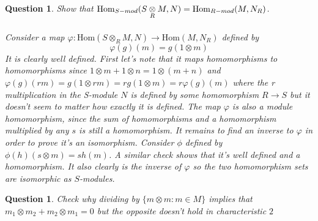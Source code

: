 \documentclass[a4paper]{article}
\newtheorem{que}[thm]{Question}
\begin{document}
\begin{que} Show that $\operatorname{Hom}_{S-mod}(S \mathbin{\mathop{\otimes}\limits_{R}} M, N) = \operatorname{Hom}_{R-mod}(M, N_R)$.\\\\
 Consider a map $\varphi:\text{Hom}\left( S\otimes_R M,  N  \right) \to \text{Hom}\left( M,N_R \right) $ defined by \[\varphi\left( g \right) \left( m \right)=g\left( 1\otimes m \right)  \]
 It is clearly well defined. First let's note that it maps homomorphisms to homomorphisms since $1\otimes m+1\otimes n=1\otimes \left( m+n \right) $ and $\varphi(g)(rm)=g(1\otimes rm)=rg\left( 1\otimes m \right)=r\varphi(g)(m) $ where the r multiplication in the S-module $N$ is defined by some homomorphism $R\to S$ but it doesn't seem to matter how exactly it is defined. The map $\varphi$ is also a module homomorphism, since the sum of homomorphisms and a homomorphism multiplied by any $s$ is still a homomorphism. It remains to find an inverse to $\varphi$ in order to prove it's an isomorphism. Consider $\phi$ defined by $\phi(h)(s\otimes m)=sh(m)$. A similar check shows that it's well defined and a homomorphism. It also clearly is the inverse of $\varphi$ so the two homomorphism sets are isomorphic as $S$-modules.

\end{que}
\begin{que} Check why dividing by $\{m \otimes m : m \in M\}$ implies that $m_1 \otimes m_2 + m_2 \otimes m_1 = 0$ but the opposite doesn't hold in characteristic $2$\\\\
   \end{que}
\end{document}
